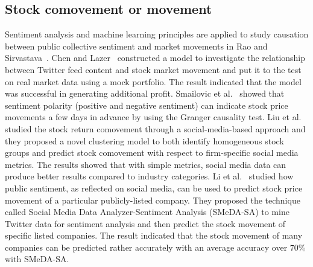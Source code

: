 \documentclass[review,3p,times,12pt,number]{elsarticle}
\begin{document}
\subsection{Stock comovement or movement}
Sentiment analysis and machine learning principles are applied to study causation between public collective sentiment and market movements in Rao and Sirvastava~\cite{Rao2012TweetSmart}.
Chen and Lazer~\cite{Chen2013Sentiment} constructed a model to investigate the relationship between Twitter feed content and stock market movement and put it to the test on real market data using a mock portfolio. The result indicated that the model was successful in generating additional profit.
Smailovic et al.~\cite{Smailovi2013Predictive} showed that sentiment polarity (positive and negative sentiment) can indicate stock price movements a few days in advance by using the Granger causality test.
Liu et al.~\cite{Liu2015A} studied the stock return comovement through a social-media-based approach and they proposed a novel clustering model to both identify homogeneous stock groups and predict stock comovement with respect to firm-specific social media metrics. The results showed that with simple metrics, social media data can produce better results compared to industry categories.
Li et al.~\cite{Li2017Discovering} studied how public sentiment, as reflected on social media, can be used to predict stock price movement of a particular publicly-listed company. They proposed the technique called Social Media Data Analyzer-Sentiment Analysis (SMeDA-SA) to mine Twitter data for sentiment analysis and then predict the stock movement of specific listed companies. The result indicated that the stock movement of many companies can be predicted rather accurately with an average accuracy over 70\% with SMeDA-SA.
\end{document}
